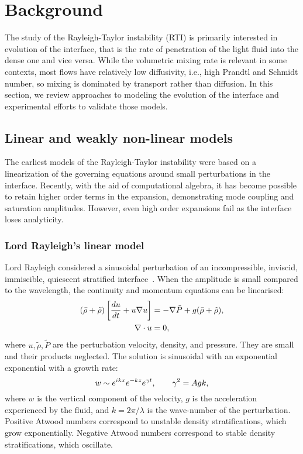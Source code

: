 \chapter{Background}

The study of the Rayleigh-Taylor instability (RTI) is primarily interested in evolution of the interface, that is the rate of penetration of the light fluid into the dense one and vice versa.
While the volumetric mixing rate is relevant in some contexts, most flows have relatively low diffusivity, i.e., high Prandtl and Schmidt number, so mixing is dominated by transport rather than diffusion.
In this section, we review approaches to modeling the evolution of the interface and experimental efforts to validate those models.

\section{Linear and weakly non-linear models} %

The earliest models of the Rayleigh-Taylor instability were based on a linearization of the governing equations around small perturbations in the interface.
Recently, with the aid of computational algebra, it has become possible to retain higher order terms in the expansion, demonstrating mode coupling and saturation amplitudes.
However, even high order expansions fail as the interface loses analyticity.

\subsection{Lord Rayleigh's linear model}

Lord Rayleigh considered a sinusoidal perturbation of an incompressible, inviscid, immiscible, quiescent stratified interface~\cite{Rayleigh1883}.
When the amplitude is small compared to the wavelength, the continuity and momentum equations can be linearised:
\begin{align}
\left(\bar\rho + \tilde\rho\right) \left[\frac{d u}{d t} + u \nabla u \right] &= - \nabla{\tilde{P}} + g(\bar\rho + \tilde\rho),\\
\nabla \cdot u &= 0,
\end{align}
where $u, \tilde\rho, \tilde{P}$ are the perturbation velocity, density, and pressure.
They are small and their products neglected.
The solution is sinusoidal with an exponential exponential with a growth rate:
\begin{equation} \elabel{simple_growth}
	w \sim e^{i k x} e^{-k z} e^{\gamma t}, \qquad  \gamma^2 = A g k,
\end{equation}
where $w$ is the vertical component of the velocity, 
$g$ is the acceleration experienced by the fluid, and
$k = 2 \pi / \lambda$ is the wave-number of the perturbation.
Positive Atwood numbers correspond to unstable density stratifications, which grow exponentially.
Negative Atwood numbers correspond to stable density stratifications, which oscillate.

